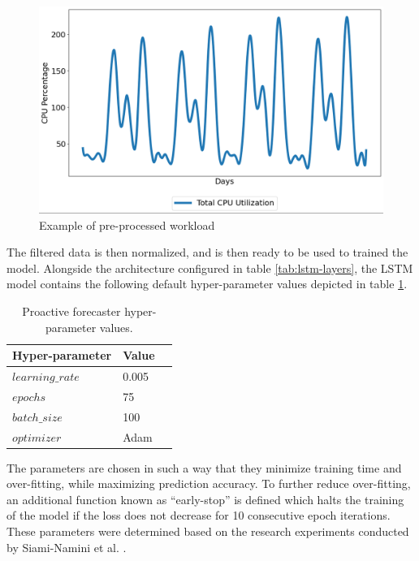 \begin{figure}[htb]
    \centering
    \caption{Example of pre-processed workload}
    \label{fig:lstm-smooth-data}
    \includegraphics[width=1.0\linewidth]{Figures/LSTM-Smooth-Data.png}
\end{figure}

The filtered data is then normalized, and is then ready to be used to trained the model. Alongside the architecture configured in table \ref{tab:lstm-layers}, the LSTM model contains the following default hyper-parameter values depicted in table \ref{tab:lstm-params}.

\begin{table}
    \caption{Proactive forecaster hyper-parameter values.}\label{tab:lstm-params}
    \centering
    \begin{tabular}{|l|l|l|}
        \hline
        Hyper-parameter & Value\\
        \hline
        $learning\_rate$ & 0.005\\
        $epochs$         & 75\\
        $batch\_size$    & 100\\
        $optimizer$      & Adam \cite{diederik2014adam}\\
        \hline
    \end{tabular}
\end{table}

The parameters are chosen in such a way that they minimize training time and over-fitting, while maximizing prediction accuracy. To further reduce over-fitting, an additional function known as ``early-stop'' is defined which halts the training of the model if the loss does not decrease for 10 consecutive epoch iterations. These parameters were determined based on the research experiments conducted by Siami-Namini et al. \cite{siami2018comparison}.\par

